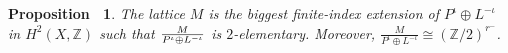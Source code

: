 \documentclass[12pt,reqno,a4paper]{amsart}
\newtheorem{prop}[thm]{Proposition~}
\theoremstyle{remark}
\theoremstyle{definition}
\newcommand{\ZZ}{\mathbb{Z}}
\begin{document}
\begin{prop}
\label{prop: M_F = Z_2-saturation}
    The lattice $M$ is the biggest finite-index extension of $P^\iota \oplus L^{-\iota}$ in $H^2(X,\ZZ)$ such that $M\over{P^{\iota}\oplus L^{-\iota}}$ is $2$-elementary. Moreover, $\frac{M}{P^{\iota}\oplus L^{-\iota}}\cong (\ZZ/2)^{r^-}$.
\end{prop}
\end{document}
